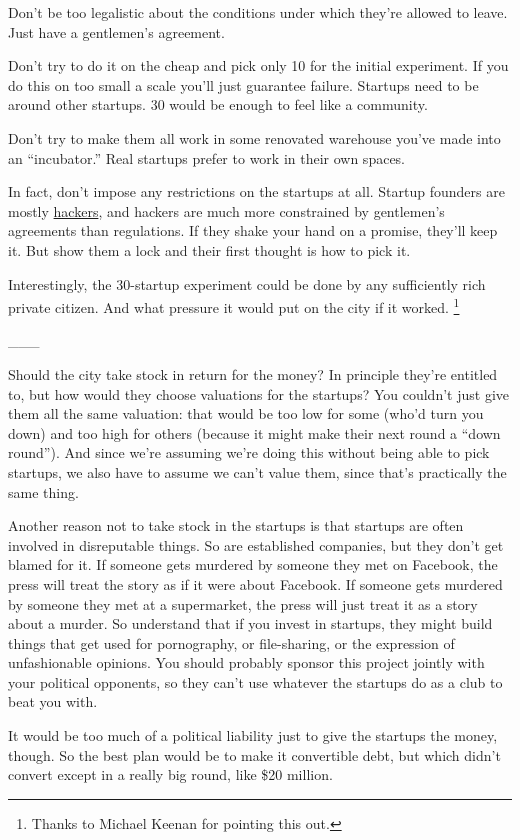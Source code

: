Don't be too legalistic about the conditions under which they're allowed
to leave. Just have a gentlemen's agreement.

Don't try to do it on the cheap and pick only 10 for the initial
experiment. If you do this on too small a scale you'll just guarantee
failure. Startups need to be around other startups. 30 would be enough
to feel like a community.

Don't try to make them all work in some renovated warehouse you've made
into an ``incubator.'' Real startups prefer to work in their own spaces.

In fact, don't impose any restrictions on the startups at all. Startup
founders are mostly \href{gba.html}{hackers}, and hackers are much more
constrained by gentlemen's agreements than regulations. If they shake
your hand on a promise, they'll keep it. But show them a lock and their
first thought is how to pick it.

Interestingly, the 30-startup experiment could be done by any
sufficiently rich private citizen. And what pressure it would put on the
city if it worked. \footnote{Thanks to Michael Keenan for pointing this out.}

\_\_\_

Should the city take stock in return for the money? In principle they're
entitled to, but how would they choose valuations for the startups? You
couldn't just give them all the same valuation: that would be too low
for some (who'd turn you down) and too high for others (because it might
make their next round a ``down round''). And since we're assuming we're
doing this without being able to pick startups, we also have to assume
we can't value them, since that's practically the same thing.

Another reason not to take stock in the startups is that startups are
often involved in disreputable things. So are established companies, but
they don't get blamed for it. If someone gets murdered by someone they
met on Facebook, the press will treat the story as if it were about
Facebook. If someone gets murdered by someone they met at a supermarket,
the press will just treat it as a story about a murder. So understand
that if you invest in startups, they might build things that get used
for pornography, or file-sharing, or the expression of unfashionable
opinions. You should probably sponsor this project jointly with your
political opponents, so they can't use whatever the startups do as a
club to beat you with.

It would be too much of a political liability just to give the startups
the money, though. So the best plan would be to make it convertible
debt, but which didn't convert except in a really big round, like \$20
million.

